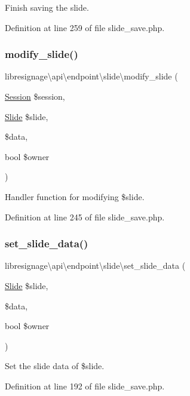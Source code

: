 Finish saving the slide. 

Definition at line 259 of file slide\+\_\+save.\+php.

\mbox{\label{namespacelibresignage_1_1api_1_1endpoint_1_1slide_a0083bc7dc1513e4a25549e74cca6521d}} 
\subsubsection{\texorpdfstring{modify\+\_\+slide()}{modify\_slide()}}
{\footnotesize\ttfamily libresignage\textbackslash{}api\textbackslash{}endpoint\textbackslash{}slide\textbackslash{}modify\+\_\+slide (\begin{DoxyParamCaption}\item[{\hyperlink{classlibresignage_1_1common_1_1php_1_1auth_1_1Session}{Session}}]{\$session,  }\item[{\hyperlink{classlibresignage_1_1common_1_1php_1_1slide_1_1Slide}{Slide}}]{\$slide,  }\item[{}]{\$data,  }\item[{bool}]{\$owner }\end{DoxyParamCaption})}

Handler function for modifying \$slide. 

Definition at line 245 of file slide\+\_\+save.\+php.

\mbox{\label{namespacelibresignage_1_1api_1_1endpoint_1_1slide_acd9b331303687c167e2101971e0a1968}} 
\subsubsection{\texorpdfstring{set\+\_\+slide\+\_\+data()}{set\_slide\_data()}}
{\footnotesize\ttfamily libresignage\textbackslash{}api\textbackslash{}endpoint\textbackslash{}slide\textbackslash{}set\+\_\+slide\+\_\+data (\begin{DoxyParamCaption}\item[{\hyperlink{classlibresignage_1_1common_1_1php_1_1slide_1_1Slide}{Slide}}]{\$slide,  }\item[{}]{\$data,  }\item[{bool}]{\$owner }\end{DoxyParamCaption})}

Set the slide data of \$slide. 

Definition at line 192 of file slide\+\_\+save.\+php.

